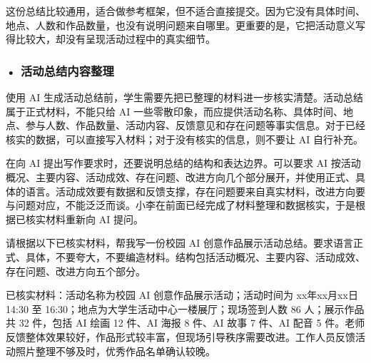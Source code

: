 这份总结比较通用，适合做参考框架，但不适合直接提交。因为它没有具体时间、地点、人数和作品数量，也没有说明问题来自哪里。更重要的是，它把活动意义写得比较大，却没有呈现活动过程中的真实细节。

\subsubsection*{\textbf{• 活动总结内容整理}}

使用 AI 生成活动总结前，学生需要先把已整理的材料进一步核实清楚。活动总结属于正式材料，不能只给 AI 一些零散印象，而应提供活动名称、具体时间、地点、参与人数、作品数量、活动内容、反馈意见和存在问题等事实信息。对于已经核实的数据，可以直接写入材料；对于没有核实的信息，则不要让 AI 自行补充。

在向 AI 提出写作要求时，还要说明总结的结构和表达边界。可以要求 AI 按活动概况、主要内容、活动成效、存在问题、改进方向几个部分展开，并使用正式、具体的语言。活动成效要有数据和反馈支撑，存在问题要来自真实材料，改进方向要与问题对应，不能泛泛而谈。小李在前面已经完成了材料整理和数据核实，于是根据已核实材料重新向 AI 提问。

\begin{userbox}
请根据以下已核实材料，帮我写一份校园 AI 创意作品展示活动总结。要求语言正式、具体，不要夸大，不要编造材料。结构包括活动概况、主要内容、活动成效、存在问题、改进方向五个部分。

已核实材料：活动名称为校园 AI 创意作品展示活动；活动时间为 xx年xx月xx日 14:30 至 16:30；地点为大学生活动中心一楼展厅；现场签到人数 86 人；展示作品共 32 件，包括 AI 绘画 12 件、AI 海报 8 件、AI 故事 7 件、AI 配音 5 件。老师反馈整体效果较好，作品形式较丰富，但现场引导秩序需要改进。工作人员反馈活动照片整理不够及时，优秀作品名单确认较晚。
\end{userbox}

